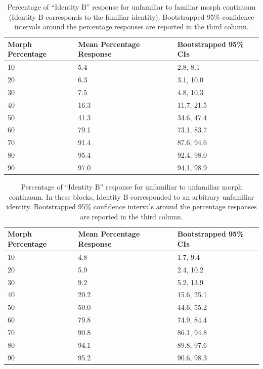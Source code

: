 \documentclass[10pt,letterpaper]{article}
\begin{document}
\setcounter{totalnumber}{3}%
\begin{table}[ht]
  \renewcommand{\thetable}{\arabic{table}a}
  \caption{\color{Gray} Percentage of “Identity B” response for unfamiliar to familiar morph continuum (Identity B corresponds to the familiar identity). Bootstrapped 95\% confidence intervals around the percentage responses are reported in the third column.}
  \label{Table 1a}
  \begin{center}
  \begin{tabular}{ | m{3.5cm} | m{5cm}| m{3.5cm} | } 
  \hline
  \textbf{Morph Percentage} & \textbf{Mean Percentage Response} & \textbf{Bootstrapped 95\% CIs} \\ 
  \hline
  10 & 5.4 & 2.8, 8.1 \\ 
  \hline
  20 & 6.3 & 3.1, 10.0 \\
  \hline
  30 & 7.5 & 4.8, 10.3 \\
  \hline
  40 & 16.3 & 11.7, 21.5 \\
  \hline
  50 & 41.3 & 34.6, 47.4 \\
  \hline
  60 & 79.1 & 73.1, 83.7 \\
  \hline
  70 & 91.4 & 87.6, 94.6 \\
  \hline
  80 & 95.4 & 92.4, 98.0 \\
  \hline
  90 & 97.0 & 94.1, 98.9 \\
  \hline
  \end{tabular}
  \end{center}
\end{table}
\vspace{0.5cm}
\begin{table}[ht]
  \addtocounter{table}{-1}
  \renewcommand{\thetable}{\arabic{table}b}
  \caption{\color{Gray} Percentage of “Identity B” response for unfamiliar to unfamiliar morph continuum. In these blocks, Identity B corresponded to an arbitrary unfamiliar identity. Bootstrapped 95\% confidence intervals around the percentage responses are reported in the third column.}
  \label{Table 1b}
  \begin{center}
  \begin{tabular}{ | m{3.5cm} | m{5cm}| m{3.5cm} | } 
  \hline
  \textbf{Morph Percentage} & \textbf{Mean Percentage Response} & \textbf{Bootstrapped 95\% CIs} \\ 
  \hline
  10 & 4.8 & 1.7, 9.4 \\ 
  \hline
  20 & 5.9 & 2.4, 10.2 \\
  \hline
  30 & 9.2 & 5.2, 13.9\\
  \hline
  40 & 20.2 & 15.6, 25.1 \\
  \hline
  50 & 50.0 & 44.6, 55.2 \\
  \hline
  60 & 79.8 & 74.9, 84.4 \\
  \hline
  70 & 90.8 & 86.1, 94.8 \\
  \hline
  80 & 94.1 & 89.8, 97.6 \\
  \hline
  90 & 95.2 & 90.6, 98.3 \\
  \hline
  \end{tabular}
  \end{center}
\end{table}
\end{document}
